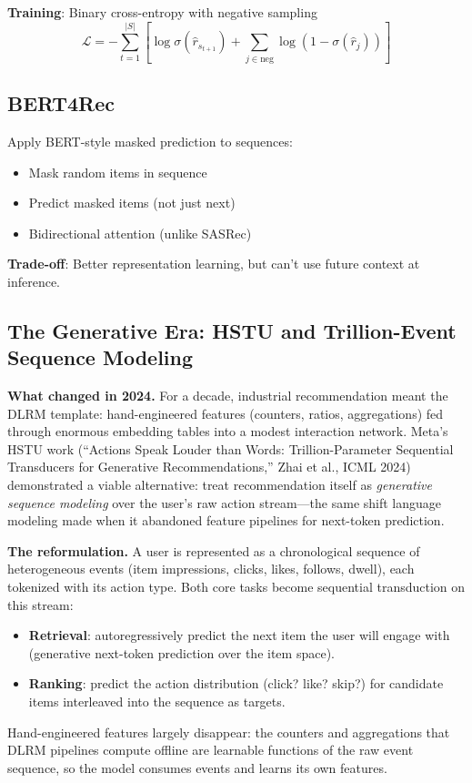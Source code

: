 \textbf{Training}: Binary cross-entropy with negative sampling
\begin{equation}
\mathcal{L} = -\sum_{t=1}^{|S|} [\log \sigma(\hat{r}_{s_{t+1}}) + \sum_{j \in \text{neg}} \log(1 - \sigma(\hat{r}_j))]
\end{equation}

\subsection{BERT4Rec}

Apply BERT-style masked prediction to sequences:
\begin{itemize}
    \item Mask random items in sequence
    \item Predict masked items (not just next)
    \item Bidirectional attention (unlike SASRec)
\end{itemize}

\textbf{Trade-off}: Better representation learning, but can't use future context at inference.

\subsection{The Generative Era: HSTU and Trillion-Event Sequence Modeling}
\label{sr:sec:generative_recsys}

\textbf{What changed in 2024.} For a decade, industrial recommendation meant the DLRM template: hand-engineered features (counters, ratios, aggregations) fed through enormous embedding tables into a modest interaction network. Meta's HSTU work (``Actions Speak Louder than Words: Trillion-Parameter Sequential Transducers for Generative Recommendations,'' Zhai et al., ICML 2024) demonstrated a viable alternative: treat recommendation itself as \textit{generative sequence modeling} over the user's raw action stream---the same shift language modeling made when it abandoned feature pipelines for next-token prediction.

\textbf{The reformulation.} A user is represented as a chronological sequence of heterogeneous events (item impressions, clicks, likes, follows, dwell), each tokenized with its action type. Both core tasks become sequential transduction on this stream:
\begin{itemize}
    \item \textbf{Retrieval}: autoregressively predict the next item the user will engage with (generative next-token prediction over the item space).
    \item \textbf{Ranking}: predict the action distribution (click? like? skip?) for candidate items interleaved into the sequence as targets.
\end{itemize}
Hand-engineered features largely disappear: the counters and aggregations that DLRM pipelines compute offline are learnable functions of the raw event sequence, so the model consumes events and learns its own features.

